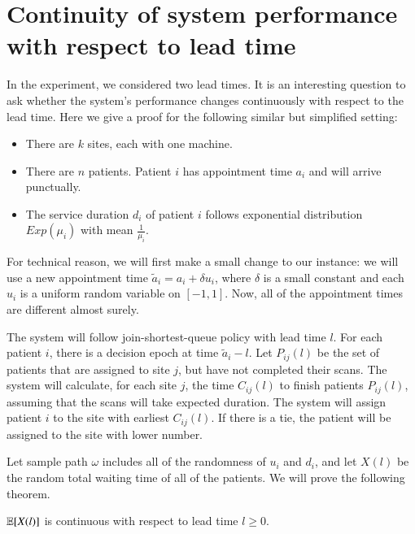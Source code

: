 \section{Continuity of system performance with respect to lead time}

In the experiment, we considered two lead times. It is an interesting question
to ask whether the system's performance changes continuously with respect to
the lead time. Here we give a proof for the following similar but simplified setting:
\begin{itemize}
\item There are $k$ sites, each with one machine.
\item There are $n$ patients. Patient $i$ has appointment time $a_i$
      and will arrive punctually.
\item The service duration $d_i$ of patient $i$ follows exponential
      distribution $Exp(\mu_i)$ with mean $\frac{1}{\mu_i}$.
\end{itemize}
For technical reason, we will first make a small change to our instance:
we will use a new appointment time $\tilde a_i = a_i + \delta u_i$,
where $\delta$ is a small constant and each $u_i$ is a uniform
random variable on $[-1,1]$. Now, all of the appointment times
are different almost surely.

The system will follow join-shortest-queue policy with lead time $l$.
For each patient $i$, there is a decision epoch at time $\tilde a_i - l$.
Let $P_{ij}(l)$ be the set of patients that are assigned to site $j$,
but have not completed their scans.
The system will calculate, for each site $j$, the time $C_{ij}(l)$ to finish patients $P_{ij}(l)$,
assuming that the scans will take expected duration. The system
will assign patient $i$ to the site with earliest $C_{ij}(l)$.
If there is a tie, the patient will be assigned to the site with
lower number.

Let sample path $\omega$ includes all of the randomness of $u_i$ and $d_i$,
and let $X(l)$ be the random total waiting time of all of the patients.
We will prove the following theorem.

\begin{thm}
  $\operatorname*{\mathbb{E}}[X(l)]$ is continuous with respect to lead time $l \ge 0$.
\end{thm}

